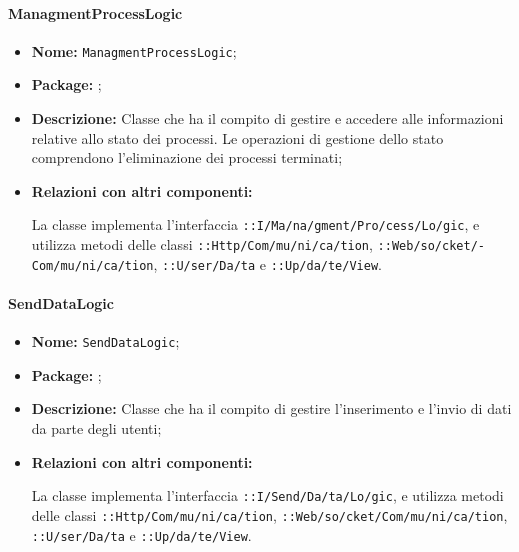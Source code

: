 \paragraph{ManagmentProcessLogic}
\begin{flushleft}
\begin{itemize}
\item \textbf{Nome:} \texttt{ManagmentProcessLogic};
\item \textbf{Package:} \texttt{\logicUser{}};
\item \textbf{Descrizione:} Classe che ha il compito di gestire e accedere alle informazioni relative allo stato dei processi. Le operazioni di gestione dello stato comprendono l'eliminazione dei processi terminati;
\item \textbf{Relazioni con altri componenti:}
\begin{sloppypar}
La classe implementa l'interfaccia \texttt{\iLogicUser{}::I\fshyp{}Ma\fshyp{}na\fshyp{}gment\fshyp{}Pro\fshyp{}cess\fshyp{}Lo\fshyp{}gic}, e utilizza metodi delle classi 
\texttt{\serverCommunication{}::Http\fshyp{}Com\fshyp{}mu\fshyp{}ni\fshyp{}ca\fshyp{}tion}, 
\texttt{\serverCommunication{}::Web\fshyp{}so\fshyp{}cket\fshyp{}Com\fshyp{}mu\fshyp{}ni\fshyp{}ca\fshyp{}tion}, \texttt{\modelUser{}::U\fshyp{}ser\fshyp{}Da\fshyp{}ta} e 
\texttt{\logicUser{}::Up\fshyp{}da\fshyp{}te\fshyp{}View}.
\end{sloppypar}
\end{itemize}
\end{flushleft}

\paragraph{SendDataLogic}
\begin{flushleft}
\begin{itemize}
\item \textbf{Nome:} \texttt{SendDataLogic};
\item \textbf{Package:} \texttt{\logicUser{}};
\item \textbf{Descrizione:} Classe che ha il compito di gestire l'inserimento e l'invio di dati da parte degli utenti;
\item \textbf{Relazioni con altri componenti:}
\begin{sloppypar}
La classe implementa l'interfaccia \texttt{\iLogicUser{}::I\fshyp{}Send\fshyp{}Da\fshyp{}ta\fshyp{}Lo\fshyp{}gic}, e utilizza metodi delle classi \texttt{\serverCommunication{}::Http\fshyp{}Com\fshyp{}mu\fshyp{}ni\fshyp{}ca\fshyp{}tion}, \texttt{\serverCommunication{}::Web\fshyp{}so\fshyp{}cket\fshyp{}Com\fshyp{}mu\fshyp{}ni\fshyp{}ca\fshyp{}tion}, \texttt{\model{}::U\fshyp{}ser\fshyp{}Da\fshyp{}ta} e \texttt{\logicUser{}::Up\fshyp{}da\fshyp{}te\fshyp{}View}.
\end{sloppypar}
\end{itemize}
\end{flushleft}

